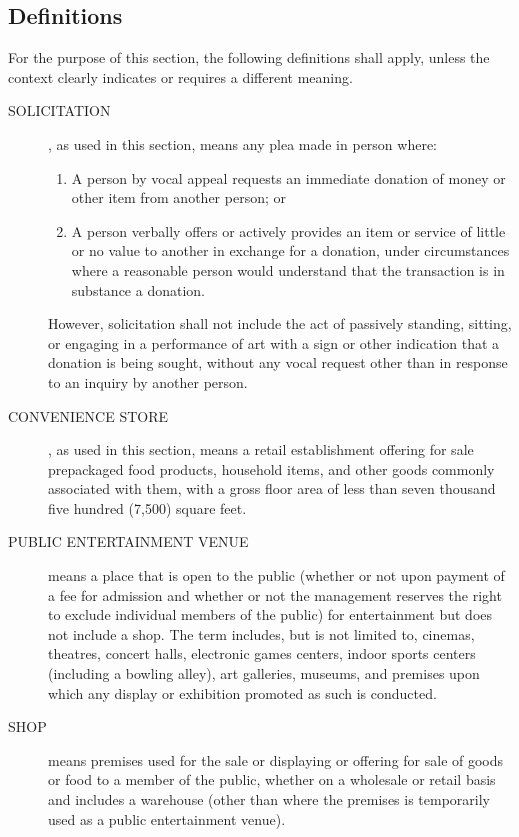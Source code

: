 \subsection{Definitions}
For the purpose of this section, the following definitions shall apply, unless the context clearly indicates or requires a different meaning.
\begin{description}
    \item[SOLICITATION], as used in this section, means any plea made in person where:
        \begin{enumerate}[{\indent}a)]
            \item A person by vocal appeal requests an immediate donation of money or other item from another person; or
            \item A person verbally offers or actively provides an item or service of little or no value to another in exchange for a donation, under circumstances where a reasonable person would understand that the transaction is in substance a donation.
        \end{enumerate}
    However, solicitation shall not include the act of passively standing, sitting, or engaging in a performance of art with a sign or other indication that a donation is being sought, without any vocal request other than in response to an inquiry by another person.
    \item[CONVENIENCE STORE], as used in this section, means a retail establishment offering for sale prepackaged food products, household items, and other goods commonly associated with them, with a gross floor area of less than seven thousand five hundred (7,500) square feet.
    \item[PUBLIC ENTERTAINMENT VENUE] means a place that is open to the public (whether or not upon payment of a fee for admission and whether or not the management reserves the right to exclude individual members of the public) for entertainment but does not include a shop.  The term includes, but is not limited to, cinemas, theatres, concert halls, electronic games centers, indoor sports centers (including a bowling alley), art galleries, museums, and premises upon which any display or exhibition promoted as such is conducted.
    \item[SHOP] means premises used for the sale or displaying or offering for sale of goods or food to a member of the public, whether on a wholesale or retail basis and includes a warehouse (other than where the premises is temporarily used as a public entertainment venue).
\end{description}

